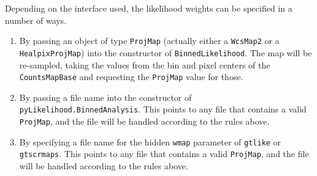 \documentclass[preprint]{aastex}
\begin{document}
Depending on the interface used, the likelihood weights can be
specified in a number of ways.

\begin{enumerate}
\item{By passing an object of type {\tt ProjMap} (actually either a
    {\tt WcsMap2} or a {\tt HealpixProjMap}) into the constructor of
    {\tt BinnedLikelihood}.  The map will be re-sampled, taking the
    values from the bin and pixel centers of the {\tt CountsMapBase}
    and requesting the {\tt ProjMap} value for those.}
\item{By passing a file name into the constructor of {\tt
      pyLikelihood.BinnedAnalysis}.  This points to any file that
    contains a valid {\tt ProjMap}, and the file will be handled
    according to the rules above.}
\item{By specifying a file name for the hidden {\tt wmap} parameter of
    {\tt gtlike} or {\tt gtscrmaps}.  This points to any file that
    contains a valid {\tt ProjMap}, and the file will be handled
    according to the rules above.}
\end{enumerate}
\end{document}
